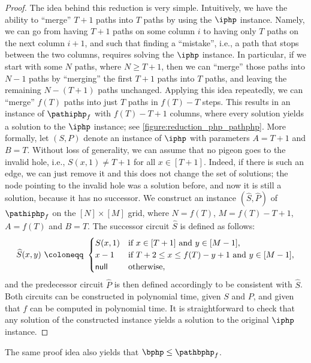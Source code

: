 \documentclass[10pt,a4paper]{article}
\theoremstyle{definition}
\theoremstyle{plain}
\theoremstyle{remark}
\newcommand{\nul}{\textup{\textsf{null}}}
\begin{document}
\begin{proof}
The idea behind this reduction is very simple. Intuitively, we have the ability to ``merge'' $T+1$ paths into $T$ paths by using the $\iphp$ instance. Namely, we can go from having $T+1$ paths on some column $i$ to having only $T$ paths on the next column $i+1$, and such that finding a ``mistake'', i.e., a path that stops between the two columns, requires solving the $\iphp$ instance. In particular, if we start with some $N$ paths, where $N \geq T+1$, then we can ``merge'' those paths into $N-1$ paths by ``merging'' the first $T+1$ paths into $T$ paths, and leaving the remaining $N-(T+1)$ paths unchanged. Applying this idea repeatedly, we can ``merge'' $f(T)$ paths into just $T$ paths in $f(T)-T$ steps. This results in an instance of $\pathiphp_f$ with $f(T)-T+1$ columns, where every solution yields a solution to the $\iphp$ instance; see \cref{figure:reduction_php_pathphp}. More formally, let $(S,P)$ denote an instance of $\iphp$ with parameters $A=T+1$ and $B=T$. Without loss of generality, we can assume that no pigeon goes to the invalid hole, i.e., $S(x,1) \neq T+1$ for all $x \in [T+1]$. Indeed, if there is such an edge, we can just remove it and this does not change the set of solutions; the node pointing to the invalid hole was a solution before, and now it is still a solution, because it has no successor. We construct an instance $(\widehat{S}, \widehat{P})$ of $\pathiphp_f$ on the $[N] \times [M]$ grid, where $N=f(T)$, $M=f(T)-T+1$, $A=f(T)$ and $B=T$. The successor circuit $\widehat{S}$ is defined as follows:
\begin{equation*}
    \widehat{S}(x,y)
    ~\coloneqq~
    \begin{cases}
    S(x,1) & \text{if } x \in [T+1] \text{ and } y \in [M-1],\\
    x-1 & \text{if } T+2 \leq x \leq f(T) - y + 1 \text{ and } y \in [M-1],\\
    \nul & \text{otherwise},
    \end{cases}
\end{equation*}
and the predecessor circuit $\widehat{P}$ is then defined accordingly to be consistent with $\widehat{S}$. Both circuits can be constructed in polynomial time, given $S$ and $P$, and given that $f$ can be computed in polynomial time. It is straightforward to check that any solution of the constructed instance yields a solution to the original $\iphp$ instance.
\end{proof}

The same proof idea also yields that $\bphp\leq \pathbphp_f$.
\end{document}
